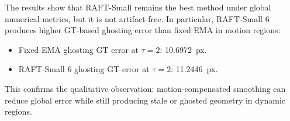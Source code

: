 \documentclass[11pt,a4paper]{article}
\begin{document}
\begin{table}[t]
\centering
\tiny
\setlength{\tabcolsep}{3pt}
\caption{Artifact-aware comparison of temporal-refinement methods. Lower is better for error, ghosting, lag, and runtime. Edge sharpness values closer to 1 indicate stronger preservation of raw disparity edges.}
\label{tab:artifact-aware-results}
\end{table}

The results show that RAFT-Small remains the best method under global numerical metrics, but it is not artifact-free. In particular, RAFT-Small 6 produces higher GT-based ghosting error than fixed EMA in motion regions:

\begin{itemize}[leftmargin=*]
\item Fixed EMA ghosting GT error at $\tau=2$: \SI{10.6972}{px}.
\item RAFT-Small 6 ghosting GT error at $\tau=2$: \SI{11.2446}{px}.
\end{itemize}

This confirms the qualitative observation: motion-compensated smoothing can reduce global error while still producing stale or ghosted geometry in dynamic regions.
\end{document}
